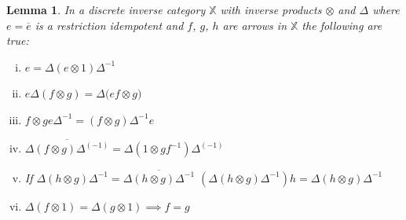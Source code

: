 \documentclass[11pt, oneside]{amsart}
\newtheorem{lemma}{Lemma}
\theoremstyle{definition}
\theoremstyle{definition}
\begin{document}

\begin{lemma}
In a discrete inverse category $\mathbb{X}$ with inverse products $\otimes$ and $\Delta$ where $e=\overline{e}$ is a restriction idempotent and $f$, $g$, $h$ are arrows in $\mathbb{X}$ the following are true:
\begin{enumerate}[(i)]
\item $e=\Delta(e\otimes{1})\Delta^{-1}$
\item $e\Delta({f}\otimes{g})=\Delta({ef}\otimes{g)}$
\item $f \otimes{ge}\Delta^{-1}=(f\otimes{g})\Delta^{-1}e$
\item $\overline{\Delta(f \otimes{g})\Delta^{(-1)}}=\Delta(1 \otimes{gf^{-1}})\Delta^{(-1)}$
\item If $\Delta({h}\otimes{g})\Delta^{-1}=\overline{\Delta({h}\otimes{g})\Delta^{-1}}$  $(\Delta({h}\otimes{g})\Delta^{-1})h=\Delta({h}\otimes{g})\Delta^{-1}$
\item $\Delta({f}\otimes{1})=\Delta({g}\otimes{1}) \implies f=g$
\end{enumerate}
\end{lemma}
\end{document}
